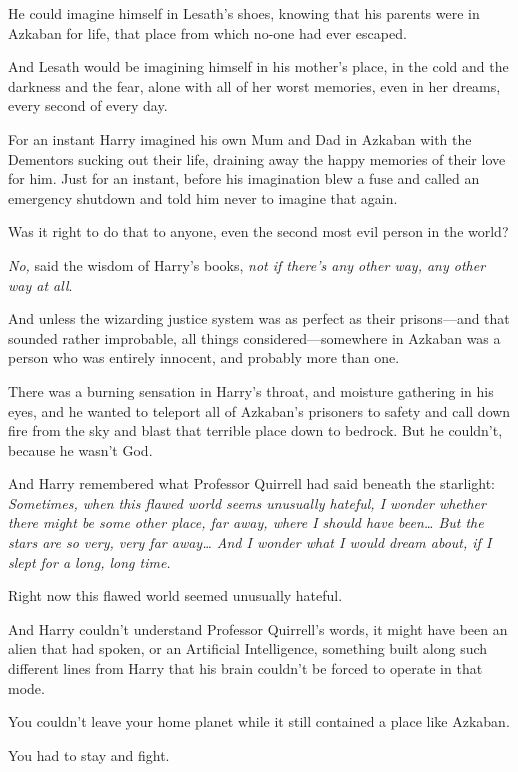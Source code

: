 He could imagine himself in Lesath's shoes, knowing that his parents were in Azkaban for life, that place from which no-one had ever escaped.

And Lesath would be imagining himself in his mother's place, in the cold and the darkness and the fear, alone with all of her worst memories, even in her dreams, every second of every day.

For an instant Harry imagined his own Mum and Dad in Azkaban with the Dementors sucking out their life, draining away the happy memories of their love for him. Just for an instant, before his imagination blew a fuse and called an emergency shutdown and told him never to imagine that again.

Was it right to do that to anyone, even the second most evil person in the world?

\emph{No,} said the wisdom of Harry's books, \emph{not if there's any other way, any other way at all}.

And unless the wizarding justice system was as perfect as their prisons—and that sounded rather improbable, all things considered—somewhere in Azkaban was a person who was entirely innocent, and probably more than one.

There was a burning sensation in Harry's throat, and moisture gathering in his eyes, and he wanted to teleport all of Azkaban's prisoners to safety and call down fire from the sky and blast that terrible place down to bedrock. But he couldn't, because he wasn't God.

And Harry remembered what Professor Quirrell had said beneath the starlight: \emph{Sometimes, when this flawed world seems unusually hateful, I wonder whether there might be some other place, far away, where I should have been{\ldots} But the stars are so very, very far away{\ldots} And I wonder what I would dream about, if I slept for a long, long time.}

Right now this flawed world seemed unusually hateful.

And Harry couldn't understand Professor Quirrell's words, it might have been an alien that had spoken, or an Artificial Intelligence, something built along such different lines from Harry that his brain couldn't be forced to operate in that mode.

You couldn't leave your home planet while it still contained a place like Azkaban.

You had to stay and fight.

